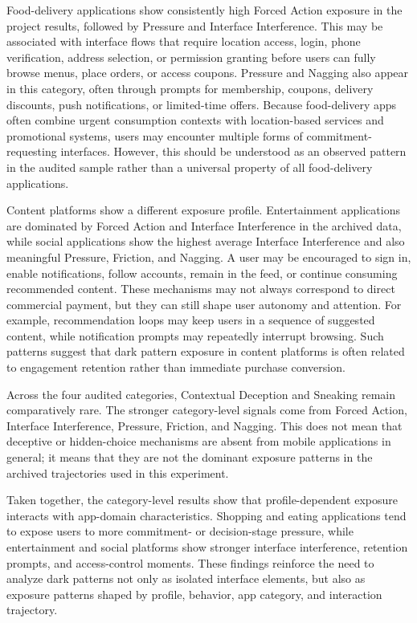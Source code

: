 Food-delivery applications show consistently high Forced Action exposure in the project results, followed by Pressure and Interface Interference. This may be associated with interface flows that require location access, login, phone verification, address selection, or permission granting before users can fully browse menus, place orders, or access coupons. Pressure and Nagging also appear in this category, often through prompts for membership, coupons, delivery discounts, push notifications, or limited-time offers. Because food-delivery apps often combine urgent consumption contexts with location-based services and promotional systems, users may encounter multiple forms of commitment-requesting interfaces. However, this should be understood as an observed pattern in the audited sample rather than a universal property of all food-delivery applications.

Content platforms show a different exposure profile. Entertainment applications are dominated by Forced Action and Interface Interference in the archived data, while social applications show the highest average Interface Interference and also meaningful Pressure, Friction, and Nagging. A user may be encouraged to sign in, enable notifications, follow accounts, remain in the feed, or continue consuming recommended content. These mechanisms may not always correspond to direct commercial payment, but they can still shape user autonomy and attention. For example, recommendation loops may keep users in a sequence of suggested content, while notification prompts may repeatedly interrupt browsing. Such patterns suggest that dark pattern exposure in content platforms is often related to engagement retention rather than immediate purchase conversion.

Across the four audited categories, Contextual Deception and Sneaking remain comparatively rare. The stronger category-level signals come from Forced Action, Interface Interference, Pressure, Friction, and Nagging. This does not mean that deceptive or hidden-choice mechanisms are absent from mobile applications in general; it means that they are not the dominant exposure patterns in the archived trajectories used in this experiment.

Taken together, the category-level results show that profile-dependent exposure interacts with app-domain characteristics. Shopping and eating applications tend to expose users to more commitment- or decision-stage pressure, while entertainment and social platforms show stronger interface interference, retention prompts, and access-control moments. These findings reinforce the need to analyze dark patterns not only as isolated interface elements, but also as exposure patterns shaped by profile, behavior, app category, and interaction trajectory.

